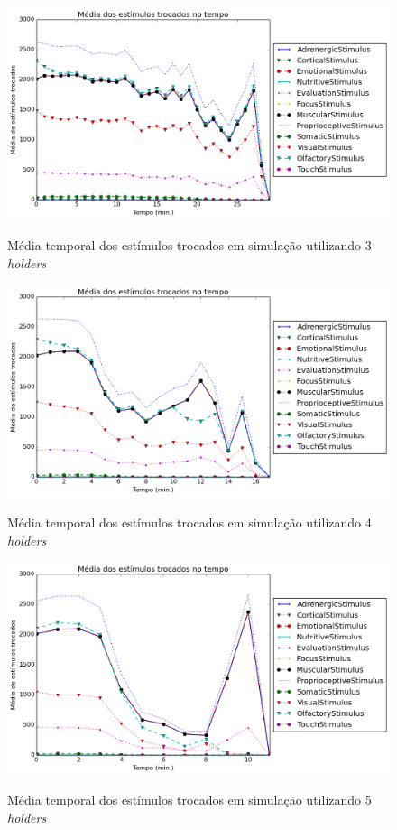 \begin{figure}[H]
  \centering
  \caption{Média temporal dos estímulos trocados em simulação utilizando 3 \textit{holders}}
  \includegraphics[scale=0.6]{04-figuras/experiments/exp_3/3/avgExchangedStimuliOverTime.png}
  \label{fig:exp_3_3_exchgStimuli}
\end{figure}

\begin{figure}[H]
  \centering
  \caption{Média temporal dos estímulos trocados em simulação utilizando 4 \textit{holders}}
  \includegraphics[scale=0.6]{04-figuras/experiments/exp_3/4/avgExchangedStimuliOverTime.png}
  \label{fig:exp_3_4_exchgStimuli}
\end{figure}

\begin{figure}[H]
  \centering
  \caption{Média temporal dos estímulos trocados em simulação utilizando 5 \textit{holders}}
  \includegraphics[scale=0.6]{04-figuras/experiments/exp_3/5/avgExchangedStimuliOverTime.png}
  \label{fig:exp_3_5_exchgStimuli}
\end{figure}

